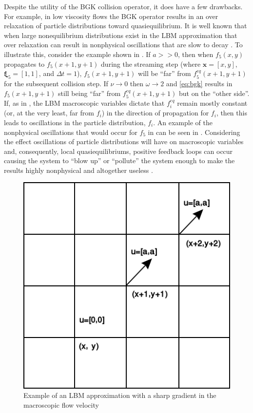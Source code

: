 \documentclass{article}
\newcommand{\pos}{\mathbf{x}}
\newcommand{\pvel}{\boldsymbol{\xi}}
\begin{document}
Despite the utility of the BGK collision operator, it does have a few drawbacks.
For example, in low viscosity flows the BGK operator results in an over relaxation of particle distributions toward quasiequilibrium.
It is well known that when large nonequilibrium distributions exist in the LBM approximation that over relaxation can result in nonphysical oscillations that are slow to decay \cite{brownlee2007stability,dellar2003incompressible}.
To illustrate this, consider the example shown in .
If $a >> 0$, then when $f_5(x,y)$ propagates to $f_5(x+1,y+1)$ during the streaming step (where $\pos = [x,y]$, $\pvel_5 = [1,1]$, and $\Delta t = 1$), $f_5(x+1,y+1)$ will be ``far'' from $f^{eq}_5(x+1,y+1)$ for the subsequent collision step.
If $\nu \rightarrow 0$ then $\omega \rightarrow 2$ and \eqref{eq:bgk} results in $f_5(x+1,y+1)$ still being ``far'' from $f^{eq}_5(x+1,y+1)$ but on the ``other side''.
If, as in , the LBM macroscopic variables dictate that $f^{eq}_i$ remain mostly constant (or, at the very least, far from $f_i$) in the direction of propagation for $f_i$, then this leads to oscillations in the particle distribution, $f_i$.
An example of the nonphysical oscillations that would occur for $f_5$ in  can be seen in .
Considering the effect oscillations of particle distributions will have on macroscopic variables and, consequently, local quasiequilibriums, positive feedback loops can occur causing the system to ``blow up'' or ``pollute'' the system enough to make the results highly nonphysical and altogether useless \cite{gorban2014enhancement}.

\begin{figure}
    \includegraphics[width=\linewidth]{figs/sharp_gradient}
    \caption{Example of an LBM approximation with a sharp gradient in the macroscopic flow velocity}
    \label{fig:sharp-grad}
\end{figure}
\end{document}
